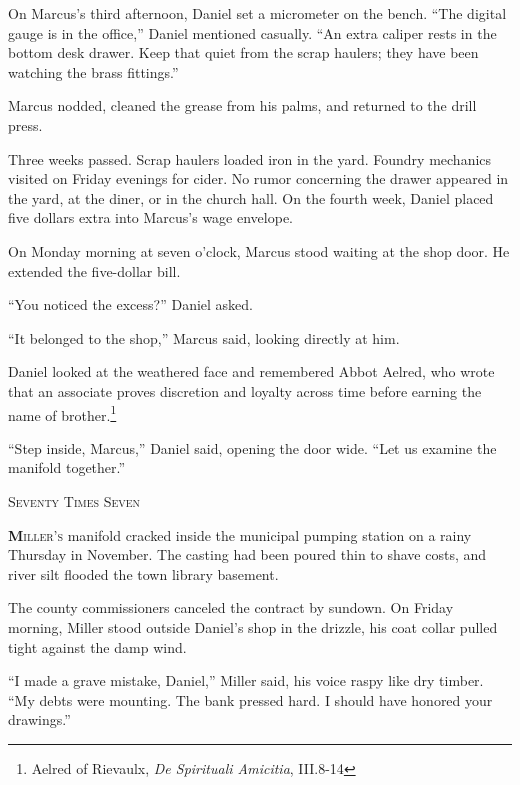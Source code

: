 \documentclass[11pt]{article}
\begin{document}
On Marcus’s third afternoon, Daniel set a micrometer on the bench. ``The digital gauge is in the office,'' Daniel mentioned casually. ``An extra caliper rests in the bottom desk drawer. Keep that quiet from the scrap haulers; they have been watching the brass fittings.''

Marcus nodded, cleaned the grease from his palms, and returned to the drill press.

Three weeks passed. Scrap haulers loaded iron in the yard. Foundry mechanics visited on Friday evenings for cider. No rumor concerning the drawer appeared in the yard, at the diner, or in the church hall. On the fourth week, Daniel placed five dollars extra into Marcus’s wage envelope.

On Monday morning at seven o’clock, Marcus stood waiting at the shop door. He extended the five-dollar bill.

``You noticed the excess?'' Daniel asked.

``It belonged to the shop,'' Marcus said, looking directly at him.

Daniel looked at the weathered face and remembered Abbot Aelred, who wrote that an associate proves discretion and loyalty across time before earning the name of brother.\footnote{Aelred of Rievaulx, \textit{De Spirituali Amicitia}, III.8-14}

``Step inside, Marcus,'' Daniel said, opening the door wide. ``Let us examine the manifold together.''

\newpage

\begin{center}
    {\scshape\large Seventy Times Seven}\par
    \vspace{0.2in}
\end{center}

\lettrine[lines=3,findent=3pt,nindent=0pt]{\textbf{M}}{iller's} manifold cracked inside the municipal pumping station on a rainy Thursday in November. The casting had been poured thin to shave costs, and river silt flooded the town library basement.

The county commissioners canceled the contract by sundown. On Friday morning, Miller stood outside Daniel’s shop in the drizzle, his coat collar pulled tight against the damp wind.

``I made a grave mistake, Daniel,'' Miller said, his voice raspy like dry timber. ``My debts were mounting. The bank pressed hard. I should have honored your drawings.''
\end{document}
